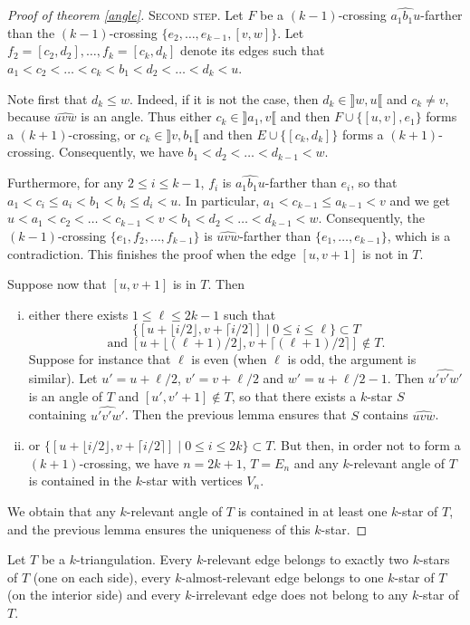 \documentclass[12pt]{amsart}
\begin{document}
\begin{proof}[Proof of theorem \ref{angle}]
\medskip
\noindent\textsc{Second step.}
Let $F$ be a $(k-1)$-crossing $\widehat{a_1b_1u}$-farther than the $(k-1)$-crossing $\{e_2,\ldots,e_{k-1},[v,w]\}$. Let $f_2=[c_2,d_2],\ldots,f_k=[c_k,d_k]$ denote its edges such that $a_1<c_2<\ldots<c_k<b_1<d_2<\ldots<d_k<u$. 

Note first that $d_k\le w$. Indeed, if it is not the case, then $d_k\in\rrbracket w,u\llbracket$ and $c_k\ne v$, because $\widehat{uvw}$ is an angle. Thus either $c_k\in\rrbracket a_1,v\llbracket$ and  then $F\cup\{[u,v],e_1\}$ forms a $(k+1)$-crossing, or $c_k\in\rrbracket v,b_1\llbracket$ and  then $E\cup\{[c_k,d_k]\}$ forms a $(k+1)$-crossing. Consequently, we have $b_1<d_2<\ldots<d_{k-1}<w$.

Furthermore, for any $2\le i\le k-1$, $f_i$ is $\widehat{a_1b_1u}$-farther than $e_i$, so that $a_1<c_i\le a_i<b_1<b_i\le d_i<u$. In particular, $a_1<c_{k-1}\le a_{k-1}<v$ and we get $u<a_1<c_2<\ldots<c_{k-1}<v<b_1<d_2<\ldots<d_{k-1}<w$. Consequently, the $(k-1)$-crossing $\{e_1,f_2,\ldots,f_{k-1}\}$ is $\widehat{uvw}$-farther than $\{e_1,\ldots,e_{k-1}\}$, which is a contradiction. This finishes the proof when the edge $[u,v+1]$ is not in $T$.

\medskip
Suppose now that $[u,v+1]$ is in $T$. Then
\begin{enumerate}[(i)]
\item either there exists $1\le\ell\le 2k-1$ such that
$$\{[u+\lfloor i/2\rfloor,v+\lceil i/2\rceil]\;|\; 0\le i\le \ell\}\subset T$$
$$\mathrm{and}\; [u+\lfloor (\ell+1)/2\rfloor,v+\lceil (\ell+1)/2\rceil]\notin T.$$
Suppose for instance that $\ell$ is even (when $\ell$ is odd, the argument is similar). Let $u'=u+\ell/2$, $v'=v+\ell/2$ and $w'=u+\ell/2-1$. Then $\widehat{u'v'w'}$ is an angle of $T$ and $[u',v'+1]\notin T$, so that there exists a $k$-star $S$ containing $\widehat{u'v'w'}$. Then the previous lemma ensures that $S$ contains $\widehat{uvw}$.
\item or $\{[u+\lfloor i/2\rfloor,v+\lceil i/2\rceil]\;|\; 0\le i\le 2k\}\subset T$.
But then, in order not to form a $(k+1)$-crossing, we have $n=2k+1$, $T=E_n$ and any $k$-relevant angle of $T$ is contained in the $k$-star with vertices $V_n$.
\end{enumerate}

\medskip
We obtain that any $k$-relevant angle of $T$ is contained in at least one $k$-star of $T$, and the previous lemma ensures the uniqueness of this $k$-star.
\end{proof}

\begin{corollary}\label{incidences}
Let $T$ be a $k$-triangulation. Every $k$-relevant edge belongs to exactly two $k$-stars of $T$ (one on each side), every $k$-almost-relevant edge belongs to one $k$-star of $T$ (on the interior side) and every $k$-irrelevant edge does not belong to any $k$-star of $T$.
\end{corollary}
\end{document}
